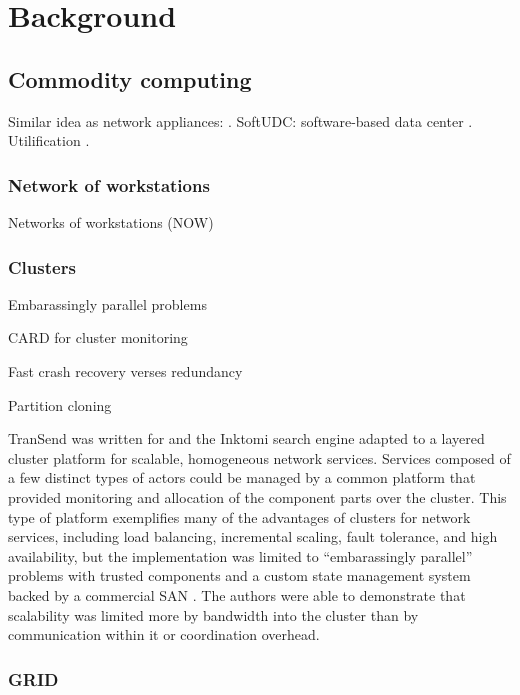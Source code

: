 \chapter{Background}



\section{Commodity computing}

Similar idea as network appliances: \cite{sapuntzakis03}. SoftUDC: software-based data center \cite{kallahalla}. Utilification \cite{wilkes04}.

\subsection{Network of workstations}
Networks of workstations (NOW)\cite{anderson95a}

\subsection{Clusters}

Embarassingly parallel problems

CARD for cluster monitoring\cite{anderson97}

Fast crash recovery verses redundancy\cite{baker94}

Partition cloning \cite{rauch}

TranSend was written for and the Inktomi search engine adapted to a layered cluster platform for scalable, homogeneous network services. Services composed of a few distinct types of actors could be managed by a common platform that provided monitoring and allocation of the component parts over the cluster. This type of platform exemplifies many of the advantages of clusters for network services, including load balancing, incremental scaling, fault tolerance, and high availability, but the implementation was limited to ``embarassingly parallel'' problems with trusted components and a custom state management system backed by a commercial SAN \cite{fox}. The authors were able to demonstrate that scalability was limited more by bandwidth into the cluster than by communication within it or coordination overhead.

\subsection{GRID}
\cite{zhao}

